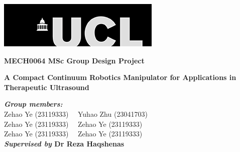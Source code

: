 \begin{titlepage}
\begin{center}
        \begin{center}
        \includegraphics[width=.70\textwidth]{Image/ucl_logo.png}
        \vspace{0.5cm}
        \end{center}
        \vspace*{0.1cm}
        \vspace{2cm}
        {\LARGE\textbf{MECH0064 MSc Group Design Project\\}}

        \vspace{2cm}
        {\huge\textbf{A Compact Continuum Robotics Manipulator for Applications in Therapeutic Ultrasound\\}}
        \vspace{0.25cm}

        \vfill

        \begin{flushleft}
        \textbf{\emph{Group members:}} \\
        Zehao Ye (23119333)~~ Yuhao Zhu (23041703)\\ 
        Zehao Ye (23119333)~~ Zehao Ye (23119333)\\ 
        Zehao Ye (23119333)~~ Zehao Ye (23119333)\\ 
        \textbf{\emph{Supervised by} Dr Reza Haqshenas}
        \end{flushleft}
        \vspace{0.8cm}
\end{center}
\end{titlepage}

